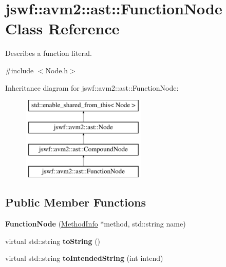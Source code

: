 \hypertarget{classjswf_1_1avm2_1_1ast_1_1_function_node}{\section{jswf\+:\+:avm2\+:\+:ast\+:\+:Function\+Node Class Reference}
\label{classjswf_1_1avm2_1_1ast_1_1_function_node}
}


Describes a function literal.  




{\ttfamily \#include $<$Node.\+h$>$}

Inheritance diagram for jswf\+:\+:avm2\+:\+:ast\+:\+:Function\+Node\+:\begin{figure}[H]
\begin{center}
\leavevmode
\includegraphics[height=4.000000cm]{classjswf_1_1avm2_1_1ast_1_1_function_node}
\end{center}
\end{figure}
\subsection*{Public Member Functions}
\begin{DoxyCompactItemize}
\item 
\hypertarget{classjswf_1_1avm2_1_1ast_1_1_function_node_a8039437e464a8e6d2e370971b1850dff}{{\bfseries Function\+Node} (\hyperlink{structjswf_1_1avm2_1_1_method_info}{Method\+Info} $\ast$method, std\+::string name)}\label{classjswf_1_1avm2_1_1ast_1_1_function_node_a8039437e464a8e6d2e370971b1850dff}

\item 
\hypertarget{classjswf_1_1avm2_1_1ast_1_1_function_node_ab9627242a660aca73ca75252a78ae0b9}{virtual std\+::string {\bfseries to\+String} ()}\label{classjswf_1_1avm2_1_1ast_1_1_function_node_ab9627242a660aca73ca75252a78ae0b9}

\item 
\hypertarget{classjswf_1_1avm2_1_1ast_1_1_function_node_a3a88a3fb8cacaa78f2f5472659f30419}{virtual std\+::string {\bfseries to\+Intended\+String} (int intend)}\label{classjswf_1_1avm2_1_1ast_1_1_function_node_a3a88a3fb8cacaa78f2f5472659f30419}

\end{DoxyCompactItemize}
